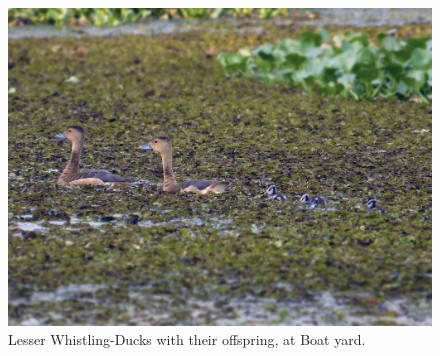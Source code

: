 \vspace*{\fill} %
\begin{figure}[!htpb]
    \centering
    \includegraphics[width=\linewidth]{Figures/whistling-duck.JPG}
    \caption[]{Lesser Whistling{-}Ducks with their offspring, at Boat yard.}
    \label{fig:figure-01}
\end{figure}
\vfill  %

